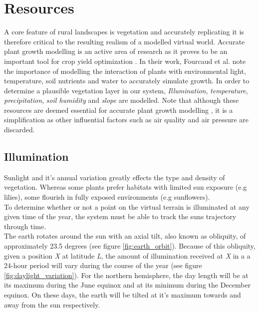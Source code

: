 \section{Resources}

A core feature of rural landscapes is vegetation and accurately replicating it is therefore critical to the resulting realism of a modelled virtual world. Accurate plant growth modelling is an active area of research as it proves to be an important tool for crop yield optimization \cite{Fourcaud2008}. In their work, Fourcaud et al. \cite{Fourcaud2008} note the importance of modelling the interaction of plants with environmental light, temperature, soil nutrients and water to accurately simulate growth. In order to determine a plausible vegetation layer in our system, \textit{Illumination}, \textit{temperature}, \textit{precipitation}, \textit{soil humidity} and \textit{slope} are modelled. Note that although these resources are deemed essential for accurate plant growth modelling \cite{Fourcaud2008}, it is a simplification as other influential factors such as air quality and air pressure are discarded.\\

\subsection{Illumination}

Sunlight and it's annual variation greatly effects the type and density of vegetation. Whereas some plants prefer habitats with limited sun exposure (e.g lilies), some flourish in fully exposed environments (e.g sunflowers). \\
To determine whether or not a point on the virtual terrain is illuminated at any given time of the year, the system must be able to track the suns trajectory through time.\\

The earth rotates around the sun with an axial tilt, also known as obliquity, of approximately 23.5 degrees (see figure \ref{fig:earth_orbit}). Because of this obliquity, given a position \textit{X} at latitude \textit{L}, the amount of illumination received at \textit{X} in a a 24-hour period will vary during the course of the year (see figure \ref{fig:daylight_variation}). For the northern hemisphere, the day length will be at its maximum during the June equinox and at its minimum during the December equinox. On these days, the earth will be tilted at it's maximum towards and away from the sun respectively.\\

